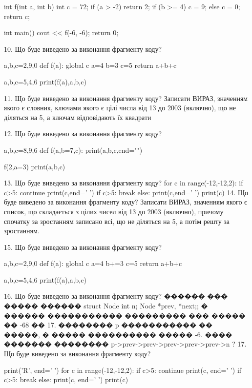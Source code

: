 \documentclass[11pt]{article}
\begin{document}
int f(int a, int b){
    int c = 72;
    if (a > -2)
        return 2;
    if (b >= 4)
         c = 9;
    else 
        c = 0;
    return c;
}

int main(){
    cout << f(-6, -6);
    return 0;
}

10. Що буде виведено за виконання фрагменту коду?

a,b,c=2,9,0
def f(a):
global c    a=4
    b=3
    c=5
    return a+b+c

a,b,c=5,4,6
print(f(a),a,b,c)

11. Що буде виведено за виконання фрагменту коду?
Записати ВИРАЗ, значенням якого є словник, ключами якого є цілі числа від 13 до 2003 (включно), що не діляться на 5, а ключам відповідають їх квадрати 

12. Що буде виведено за виконання фрагменту коду?

a,b,c=8,9,6
def f(a,b=7,c):
    print(a,b,c,end="")

f(2,a=3)
print(a,b,c)


13. Що буде виведено за виконання фрагменту коду?
for c in range(-12,-12,2):
     if c>5: continue
     print(c,end=' ')
     if c>5: break
   else: print(c,end=' ')
   print(c)
14. Що буде виведено за виконання фрагменту коду?
Записати ВИРАЗ, значенням якого є список, що складається з цілих чисел від 13 до 2003 (включно), причому спочатку за зростанням записано всі, що не діляться на 5, а потім решту за зростанням.

15. Що буде виведено за виконання фрагменту коду?

a,b,c=2,9,0
def f(a):
global c    a=4
    b+=3
    c=5
    return a+b+c

a,b,c=5,4,6
print(f(a),a,b,c)

16. Що буде виведено за виконання фрагменту коду?
������ ��� ����� ������ struct Node {int n; Node *prev, *next;};
� ������ ����������� ��������� ��� ����� �� -68 �� 17. �������� p ����������� �� �����, � ����� ���������� ����� -6.
���� ������� �������� p->prev->prev->prev->prev->prev->n ?
17. Що буде виведено за виконання фрагменту коду?

print('R', end=' ')
for c in range(-12,-12,2):
    if c>5:
        continue
        print(c, end=' ')
    if c>5:
        break
    else:
        print(c, end=' ')
    print(c)
\end{document}
